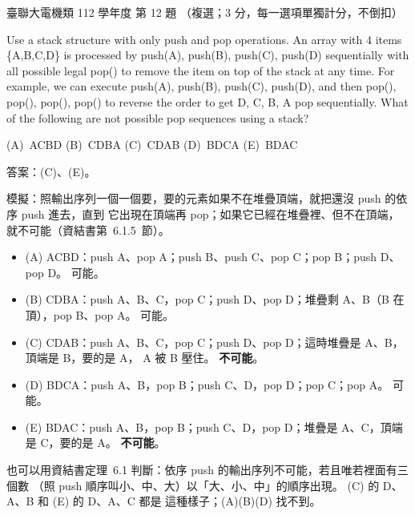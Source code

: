 \begin{pastexam}[label={px:ust-112-ee-ds-12}]{臺聯大電機類 112 學年度 第 12 題}
（複選；3 分，每一選項單獨計分，不倒扣）

Use a stack structure with only push and pop operations. An array with 4 items \{A,B,C,D\} is
processed by push(A), push(B), push(C), push(D) sequentially with all possible legal pop() to remove
the item on top of the stack at any time. For example, we can execute push(A), push(B), push(C),
push(D), and then pop(), pop(), pop(), pop() to reverse the order to get D, C, B, A pop
sequentially. What of the following are not possible pop sequences using a stack?

(A)~ACBD \qquad (B)~CDBA \qquad (C)~CDAB \qquad (D)~BDCA \qquad (E)~BDAC
\end{pastexam}

\begin{pastsoln}
答案：(C)、(E)。

模擬：照輸出序列一個一個要，要的元素如果不在堆疊頂端，就把還沒 push 的依序 push 進去，直到
它出現在頂端再 pop；如果它已經在堆疊裡、但不在頂端，就不可能（資結書第~6.1.5~節）。

\begin{itemize}
\item (A) ACBD：push A、pop A；push B、push C、pop C；pop B；push D、pop D。 可能。
\item (B) CDBA：push A、B、C，pop C；push D、pop D；堆疊剩 A、B（B 在頂），pop B、pop A。 可能。
\item (C) CDAB：push A、B、C，pop C；push D、pop D；這時堆疊是 A、B，頂端是 B，要的是 A，
A 被 B 壓住。 \textbf{不可能}。
\item (D) BDCA：push A、B，pop B；push C、D，pop D；pop C；pop A。 可能。
\item (E) BDAC：push A、B，pop B；push C、D，pop D；堆疊是 A、C，頂端是 C，要的是 A。
\textbf{不可能}。
\end{itemize}

也可以用資結書定理~6.1 判斷：依序 push 的輸出序列不可能，若且唯若裡面有三個數
（照 push 順序叫小、中、大）以「大、小、中」的順序出現。 (C) 的 D、A、B 和 (E) 的 D、A、C 都是
這種樣子；(A)(B)(D) 找不到。
\end{pastsoln}

